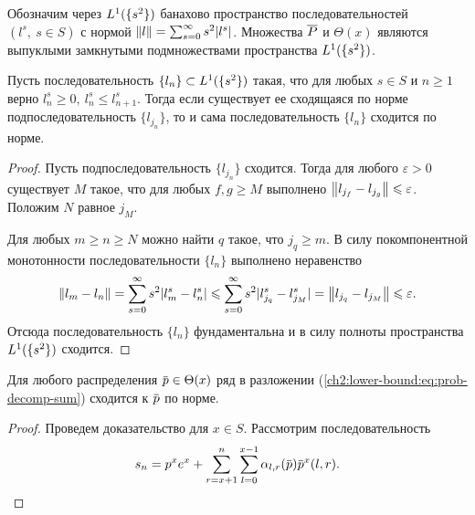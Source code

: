 {Обозначим через $L^1(\{s^2\})$ банахово пространство последовательностей $(l^s,\ s \in S)$ с нормой $\left\lVert l\right\rVert = \sum_{s = 0}^\infty s^2 |l^s|$.
Множества $\overline{P}$ и $\Theta(x)$ являются выпуклыми замкнутыми подмножествами пространства $L^1(\{s^2\})$.

\begin{lemma}
  \label{ch2:lower-bound:lemma:subseq-convergence}
  Пусть последовательность $\{l_n\} \subset L^1(\{s^2\})$ такая, что для любых $s \in S$ и $n \geqslant 1$ верно $l_n^s \geqslant 0,\ l_n^s \leqslant l_{n+1}^s$.
  Тогда если существует ее сходящаяся по норме подпоследовательность $\{l_{j_n}\}$, то и сама последовательность $\{l_n\}$ сходится по норме.
\end{lemma}
\begin{proof}
  Пусть подпоследовательность $\{l_{j_n}\}$ сходится.
  Тогда для любого $\varepsilon > 0$ существует $M$ такое, что для любых $f, g \geqslant M$ выполнено 
  $\left\lVert l_{j_f} - l_{j_g}\right\rVert \leqslant \varepsilon$.
  Положим $N$ равное $j_M$.
  
  Для любых $m \geqslant n \geqslant N$ можно найти $q$ такое, что $j_q \geqslant m$.
  В силу покомпонентной монотонности последовательности $\{l_n\}$ выполнено неравенство
  \begin{gather*}
    \left\lVert l_m - l_n\right\rVert =
    \sum_{s=0}^\infty s^2 |l_m^s - l_n^s| \leqslant
    \sum_{s=0}^\infty s^2 |l_{j_q}^s - l_{j_M}^s| =
    \left\lVert l_{j_q} - l_{j_M}\right\rVert \leqslant \varepsilon.
  \end{gather*}
  Отсюда последовательность $\{l_n\}$ фундаментальна и в силу полноты пространства $L^1(\{s^2\})$ сходится.
\end{proof}

\begin{lemma}
  \label{ch2:lower-bound:lemma:decomp-convergence}
  Для любого распределения $\p \in \Theta(x)$ ряд в разложении (\ref{ch2:lower-bound:eq:prob-decomp-sum}) сходится к $\p$ по норме.
\end{lemma}
\begin{proof}
  Проведем доказательство для $x \in S$.
  Рассмотрим последовательность
  \begin{equation*}
    s_n = p^x e^x + \sum_{r=x+1}^n \sum_{l=0}^{x-1} \alpha_{l,r}(\p) \p^x(l, r).
  \end{equation*}


\end{proof}}
